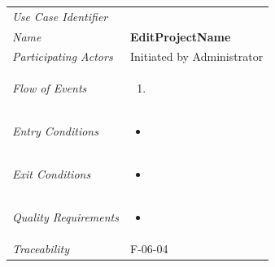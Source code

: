 \documentclass[12pt,letterpaper]{article}
\begin{document}
\begin{center}
	\begin{tabu} to 
		\toprule
		Use Case Identifier & \editprojectname{} \\
		Name & {\bf EditProjectName} \\
		Participating Actors & Initiated by Administrator \\
		Flow of Events & 
	    \begin{enumerate}[topsep=-1em,leftmargin=*]
		    \item 
		\end{enumerate} \\

		Entry Conditions &
		\begin{itemize}[topsep=-1em,leftmargin=*]
		    \item 
        \end{itemize} \\

		Exit Conditions &
		\begin{itemize}[topsep=-1em,leftmargin=*]
		    \item 
        \end{itemize} \\

		Quality Requirements &
		\begin{itemize}[topsep=-1em,leftmargin=*]
		    \item 
        \end{itemize} \\

		Traceability & F-06-04 \\
		\toprule
	\end{tabu}
\end{center}
\end{document}
